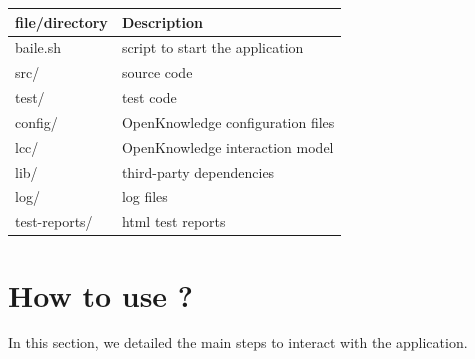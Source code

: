 \documentclass{article}	%
\begin{document}
 \begin{table}[htb]
  \centering
  \begin{tabular}{|l|l|}
  \hline
  file/directory & Description \\
  \hline
  \hline
  baile.sh & script to start the application \\
  src/ & source code \\
  test/ & test code \\
  config/ & OpenKnowledge configuration files \\
  lcc/ & OpenKnowledge interaction model \\
  lib/ & third-party dependencies \\
  log/ & log files \\
  test-reports/ & html test reports \\
  \hline
  \end{tabular}
  \end{table}

\newpage 

\section{ How to use ? }
In this section, we detailed the main steps to interact with the application.
\end{document}
